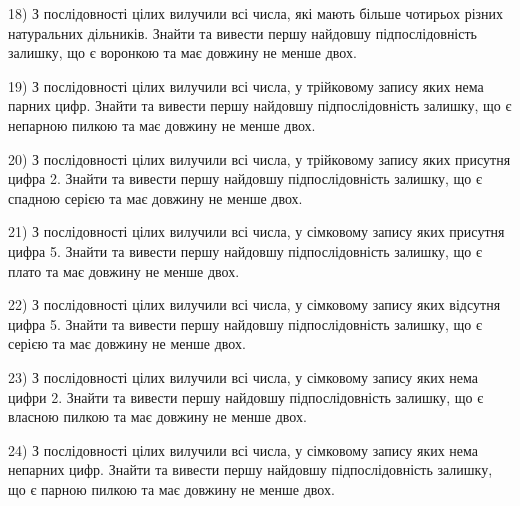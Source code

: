 \documentclass[11pt, ukrainian]{article}
\begin{document}
\par
\vspace{0.9cm}
18) \space 
З послідовності цілих вилучили всі числа, які мають більше чотирьох різних натуральних дільників. Знайти та вивести першу найдовшу підпослідовність залишку, що є воронкою та має довжину не менше двох.

\par
\vspace{0.9cm}
19) \space 
З послідовності цілих вилучили всі числа, у трійковому запису яких нема парних цифр. Знайти та вивести першу найдовшу підпослідовність залишку, що є непарною пилкою та має довжину не менше двох.

\par
\vspace{0.9cm}
20) \space 
З послідовності цілих вилучили всі числа, у трійковому запису яких присутня цифра 2. Знайти та вивести першу найдовшу підпослідовність залишку, що є спадною серією та має довжину не менше двох.

\par
\vspace{0.9cm}
21) \space 
З послідовності цілих вилучили всі числа, у сімковому запису яких присутня цифра 5. Знайти та вивести першу найдовшу підпослідовність залишку, що є плато та має довжину не менше двох.

\par
\vspace{0.9cm}
22) \space 
З послідовності цілих вилучили всі числа, у сімковому запису яких відсутня цифра 5. Знайти та вивести першу найдовшу підпослідовність залишку, що є серією та має довжину не менше двох.

\par
\vspace{0.9cm}
23) \space 
З послідовності цілих вилучили всі числа, у сімковому запису яких нема цифри 2. Знайти та вивести першу найдовшу підпослідовність залишку, що є власною пилкою та має довжину не менше двох.

\par
\vspace{0.9cm}
24) \space 
З послідовності цілих вилучили всі числа, у сімковому запису яких нема непарних цифр. Знайти та вивести першу найдовшу підпослідовність залишку, що є парною пилкою та має довжину не менше двох.
\end{document}
